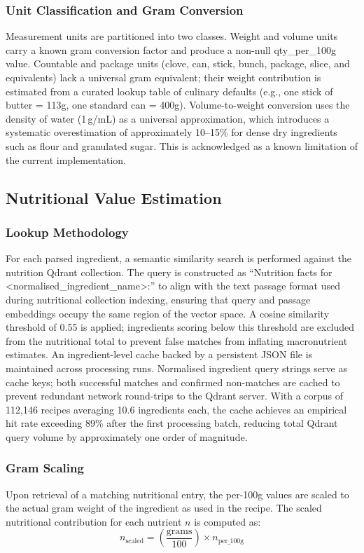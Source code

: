 \documentclass[conference]{IEEEtran}
\begin{document}
\subsubsection{Unit Classification and Gram Conversion}
Measurement units are partitioned into two classes. Weight and volume units carry a known gram conversion factor and produce a non-null qty\_per\_100g value. Countable and package units (clove, can, stick, bunch, package, slice, and equivalents) lack a universal gram equivalent; their weight contribution is estimated from a curated lookup table of culinary defaults (e.g., one stick of butter = 113g, one standard can = 400g). Volume-to-weight conversion uses the density of water (1\,g/mL) as a universal approximation, which introduces a systematic overestimation of approximately 10--15\% for dense dry ingredients such as flour and granulated sugar. This is acknowledged as a known limitation of the current implementation.

\subsection{Nutritional Value Estimation}
\subsubsection{Lookup Methodology}
For each parsed ingredient, a semantic similarity search is performed against the nutrition Qdrant collection. The query is constructed as ``Nutrition facts for \textless normalised\_ingredient\_name\textgreater:'' to align with the text passage format used during nutritional collection indexing, ensuring that query and passage embeddings occupy the same region of the vector space. A cosine similarity threshold of 0.55 is applied; ingredients scoring below this threshold are excluded from the nutritional total to prevent false matches from inflating macronutrient estimates. An ingredient-level cache backed by a persistent JSON file is maintained across processing runs. Normalised ingredient query strings serve as cache keys; both successful matches and confirmed non-matches are cached to prevent redundant network round-trips to the Qdrant server. With a corpus of 112,146 recipes averaging 10.6 ingredients each, the cache achieves an empirical hit rate exceeding 89\% after the first processing batch, reducing total Qdrant query volume by approximately one order of magnitude.

\subsubsection{Gram Scaling}
Upon retrieval of a matching nutritional entry, the per-100g values are scaled to the actual gram weight of the ingredient as used in the recipe. The scaled nutritional contribution for each nutrient $n$ is computed as:
\[
n_{\text{scaled}} = \left(\frac{\text{grams}}{100}\right) \times n_{\text{per\_100g}}
\]
\end{document}
